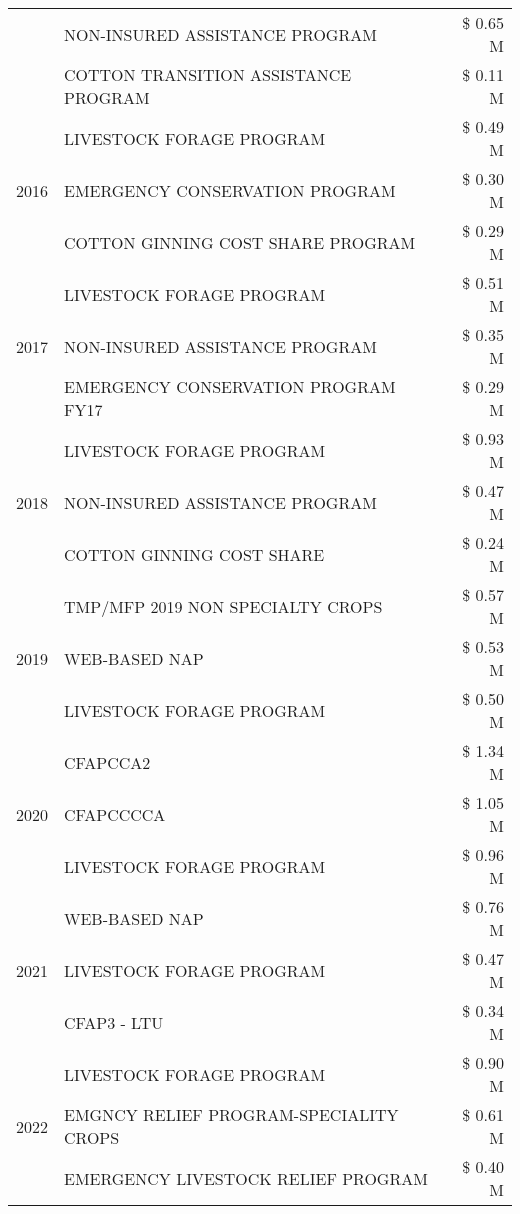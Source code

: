 \begin{tabular}{llr}
 & NON-INSURED ASSISTANCE PROGRAM & \$ 0.65 M \\
 & COTTON TRANSITION ASSISTANCE PROGRAM & \$ 0.11 M \\
\cline{1-3}
\multirow[t]{3}{*}{2016} & LIVESTOCK FORAGE PROGRAM & \$ 0.49 M \\
 & EMERGENCY CONSERVATION PROGRAM & \$ 0.30 M \\
 & COTTON GINNING COST SHARE PROGRAM & \$ 0.29 M \\
\cline{1-3}
\multirow[t]{3}{*}{2017} & LIVESTOCK FORAGE PROGRAM & \$ 0.51 M \\
 & NON-INSURED ASSISTANCE PROGRAM & \$ 0.35 M \\
 & EMERGENCY CONSERVATION PROGRAM FY17 & \$ 0.29 M \\
\cline{1-3}
\multirow[t]{3}{*}{2018} & LIVESTOCK FORAGE PROGRAM & \$ 0.93 M \\
 & NON-INSURED ASSISTANCE PROGRAM & \$ 0.47 M \\
 & COTTON GINNING COST SHARE & \$ 0.24 M \\
\cline{1-3}
\multirow[t]{3}{*}{2019} & TMP/MFP 2019 NON SPECIALTY CROPS & \$ 0.57 M \\
 & WEB-BASED NAP & \$ 0.53 M \\
 & LIVESTOCK FORAGE PROGRAM & \$ 0.50 M \\
\cline{1-3}
\multirow[t]{3}{*}{2020} & CFAPCCA2 & \$ 1.34 M \\
 & CFAPCCCCA & \$ 1.05 M \\
 & LIVESTOCK FORAGE PROGRAM & \$ 0.96 M \\
\cline{1-3}
\multirow[t]{3}{*}{2021} & WEB-BASED NAP & \$ 0.76 M \\
 & LIVESTOCK FORAGE PROGRAM & \$ 0.47 M \\
 & CFAP3 - LTU & \$ 0.34 M \\
\cline{1-3}
\multirow[t]{3}{*}{2022} & LIVESTOCK FORAGE PROGRAM & \$ 0.90 M \\
 & EMGNCY RELIEF PROGRAM-SPECIALITY CROPS & \$ 0.61 M \\
 & EMERGENCY LIVESTOCK RELIEF PROGRAM & \$ 0.40 M \\
\cline{1-3}
\bottomrule
\end{tabular}

